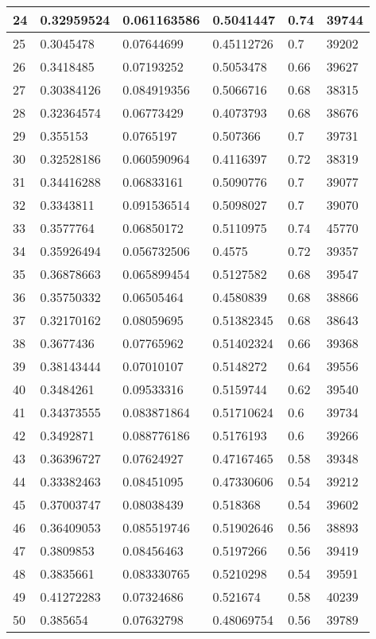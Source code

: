 \begin{longtable}{|l|l|l|l|l|l|}
24 & 0.32959524 & 0.061163586 & 0.5041447 & 0.74 & 39744 \\ \hline 
25 & 0.3045478 & 0.07644699 & 0.45112726 & 0.7 & 39202 \\ \hline 
26 & 0.3418485 & 0.07193252 & 0.5053478 & 0.66 & 39627 \\ \hline 
27 & 0.30384126 & 0.084919356 & 0.5066716 & 0.68 & 38315 \\ \hline 
28 & 0.32364574 & 0.06773429 & 0.4073793 & 0.68 & 38676 \\ \hline 
29 & 0.355153 & 0.0765197 & 0.507366 & 0.7 & 39731 \\ \hline 
30 & 0.32528186 & 0.060590964 & 0.4116397 & 0.72 & 38319 \\ \hline 
31 & 0.34416288 & 0.06833161 & 0.5090776 & 0.7 & 39077 \\ \hline 
32 & 0.3343811 & 0.091536514 & 0.5098027 & 0.7 & 39070 \\ \hline 
33 & 0.3577764 & 0.06850172 & 0.5110975 & 0.74 & 45770 \\ \hline 
34 & 0.35926494 & 0.056732506 & 0.4575 & 0.72 & 39357 \\ \hline 
35 & 0.36878663 & 0.065899454 & 0.5127582 & 0.68 & 39547 \\ \hline 
36 & 0.35750332 & 0.06505464 & 0.4580839 & 0.68 & 38866 \\ \hline 
37 & 0.32170162 & 0.08059695 & 0.51382345 & 0.68 & 38643 \\ \hline 
38 & 0.3677436 & 0.07765962 & 0.51402324 & 0.66 & 39368 \\ \hline 
39 & 0.38143444 & 0.07010107 & 0.5148272 & 0.64 & 39556 \\ \hline 
40 & 0.3484261 & 0.09533316 & 0.5159744 & 0.62 & 39540 \\ \hline 
41 & 0.34373555 & 0.083871864 & 0.51710624 & 0.6 & 39734 \\ \hline 
42 & 0.3492871 & 0.088776186 & 0.5176193 & 0.6 & 39266 \\ \hline 
43 & 0.36396727 & 0.07624927 & 0.47167465 & 0.58 & 39348 \\ \hline 
44 & 0.33382463 & 0.08451095 & 0.47330606 & 0.54 & 39212 \\ \hline 
45 & 0.37003747 & 0.08038439 & 0.518368 & 0.54 & 39602 \\ \hline 
46 & 0.36409053 & 0.085519746 & 0.51902646 & 0.56 & 38893 \\ \hline 
47 & 0.3809853 & 0.08456463 & 0.5197266 & 0.56 & 39419 \\ \hline 
48 & 0.3835661 & 0.083330765 & 0.5210298 & 0.54 & 39591 \\ \hline 
49 & 0.41272283 & 0.07324686 & 0.521674 & 0.58 & 40239 \\ \hline 
50 & 0.385654 & 0.07632798 & 0.48069754 & 0.56 & 39789 \\ \hline 
\end{longtable}